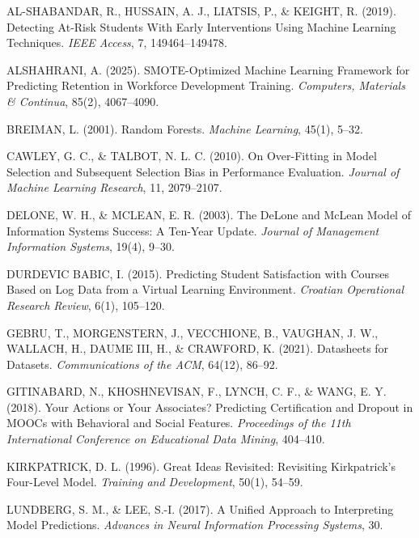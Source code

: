 \documentclass[12pt,a4paper,twoside,openany]{report}
\begin{document}
\begin{description}[leftmargin=0cm, itemsep=0.5em]

\item AL-SHABANDAR, R., HUSSAIN, A. J., LIATSIS, P., \& KEIGHT, R. (2019). Detecting At-Risk Students With Early Interventions Using Machine Learning Techniques. \textit{IEEE Access}, 7, 149464--149478.

\item ALSHAHRANI, A. (2025). SMOTE-Optimized Machine Learning Framework for Predicting Retention in Workforce Development Training. \textit{Computers, Materials \& Continua}, 85(2), 4067--4090.

\item BREIMAN, L. (2001). Random Forests. \textit{Machine Learning}, 45(1), 5--32.

\item CAWLEY, G. C., \& TALBOT, N. L. C. (2010). On Over-Fitting in Model Selection and Subsequent Selection Bias in Performance Evaluation. \textit{Journal of Machine Learning Research}, 11, 2079--2107.

\item DELONE, W. H., \& MCLEAN, E. R. (2003). The DeLone and McLean Model of Information Systems Success: A Ten-Year Update. \textit{Journal of Management Information Systems}, 19(4), 9--30.

\item DURDEVIC BABIC, I. (2015). Predicting Student Satisfaction with Courses Based on Log Data from a Virtual Learning Environment. \textit{Croatian Operational Research Review}, 6(1), 105--120.

\item GEBRU, T., MORGENSTERN, J., VECCHIONE, B., VAUGHAN, J. W., WALLACH, H., DAUME III, H., \& CRAWFORD, K. (2021). Datasheets for Datasets. \textit{Communications of the ACM}, 64(12), 86--92.

\item GITINABARD, N., KHOSHNEVISAN, F., LYNCH, C. F., \& WANG, E. Y. (2018). Your Actions or Your Associates? Predicting Certification and Dropout in MOOCs with Behavioral and Social Features. \textit{Proceedings of the 11th International Conference on Educational Data Mining}, 404--410.

\item KIRKPATRICK, D. L. (1996). Great Ideas Revisited: Revisiting Kirkpatrick's Four-Level Model. \textit{Training and Development}, 50(1), 54--59.

\item LUNDBERG, S. M., \& LEE, S.-I. (2017). A Unified Approach to Interpreting Model Predictions. \textit{Advances in Neural Information Processing Systems}, 30.


\end{description}
\end{document}
